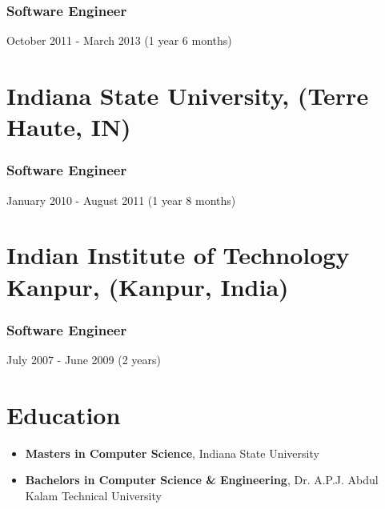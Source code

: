 \documentclass[letterpaper,9pt]{article}
\begin{document}
    \subsubsection{Software Engineer}{October 2011 - March 2013 (1 year 6 months)}

    
    \section{Indiana State University, (Terre Haute, IN)}
    \subsubsection{Software Engineer}{January 2010 - August 2011 (1 year 8 months)}

    
    \section{Indian Institute of Technology Kanpur, (Kanpur, India)}
    \subsubsection{Software Engineer}{July 2007 - June 2009 (2 years)}
    

    \section{Education}
    \begin{itemize}
    	\item \textbf{\color{black}Masters in Computer Science}, Indiana State University
    	\item \textbf{\color{black}Bachelors in Computer Science \& Engineering}, Dr. A.P.J. Abdul Kalam Technical University
    \end{itemize}


    
\end{document}

